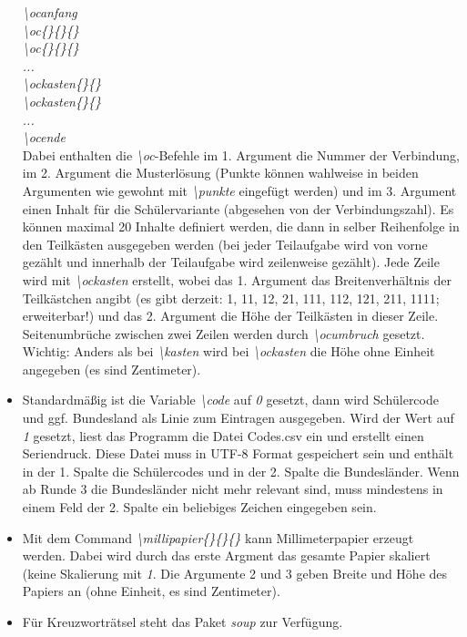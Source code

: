 \documentclass[./main.tex]{subfiles}
\begin{document}
\begin{itemize}
{    \textit{\textbackslash ocanfang \\\textbackslash oc\{\}\{\}\{\} \\\textbackslash oc\{\}\{\}\{\} \\...\\\textbackslash ockasten\{\}\{\}\\\textbackslash ockasten\{\}\{\}\\...\\\textbackslash ocende}\\
    Dabei enthalten die \textit{\textbackslash oc}-Befehle im 1. Argument die Nummer der Verbindung, im 2. Argument die Musterl\"osung (Punkte k\"onnen wahlweise in beiden Argumenten wie gewohnt mit \textit{\textbackslash punkte} eingef\"ugt werden) und im 3. Argument einen Inhalt f\"ur die Sch\"ulervariante (abgesehen von der Verbindungszahl). Es k\"onnen maximal 20 Inhalte definiert werden, die dann in selber Reihenfolge in den Teilk\"asten ausgegeben werden (bei jeder Teilaufgabe wird von vorne gez\"ahlt und innerhalb der Teilaufgabe wird zeilenweise gez\"ahlt). Jede Zeile wird mit \textit{\textbackslash ockasten} erstellt, wobei das 1. Argument das Breitenverh\"altnis der Teilk\"astchen angibt (es gibt derzeit: 1, 11, 12, 21, 111, 112, 121, 211, 1111; erweiterbar!) und das 2. Argument die H\"ohe der Teilk\"asten in dieser Zeile. Seitenumbr\"uche zwischen zwei Zeilen werden durch \textit{\hypertarget{ocumbruch}{\textbackslash ocumbruch}} gesetzt. \\Wichtig: Anders als bei \textit{\textbackslash kasten} wird bei \textit{\textbackslash ockasten} die H\"ohe ohne Einheit angegeben (es sind Zentimeter). }
    \item Standardm\"a\ss{}ig ist die Variable \hypertarget{code}{\textit{\textbackslash code}} auf \textit{0} gesetzt, dann wird Sch\"ulercode und ggf. Bundesland als Linie zum Eintragen ausgegeben. Wird der Wert auf \textit{1} gesetzt, liest das Programm die Datei Codes.csv ein und erstellt einen Seriendruck. Diese Datei muss in UTF-8 Format gespeichert sein und enth\"alt in der 1. Spalte die Sch\"ulercodes und in der 2. Spalte die Bundesl\"ander. Wenn ab Runde 3 die Bundesl\"ander nicht mehr relevant sind, muss mindestens in einem Feld der 2. Spalte ein beliebiges Zeichen eingegeben sein.
    \item \hypertarget{millipapier}{} Mit dem Command \textit{\textbackslash millipapier\{\}\{\}\{\}} kann Millimeterpapier erzeugt werden. Dabei wird durch das erste Argment das gesamte Papier skaliert (keine Skalierung mit \textit{1}. Die Argumente 2 und 3 geben Breite und H\"ohe des Papiers an (ohne Einheit, es sind Zentimeter).
    \item F\"ur Kreuzwortr\"atsel steht das Paket \textit{soup} zur Verf\"ugung. 
\end{itemize}
\end{document}
